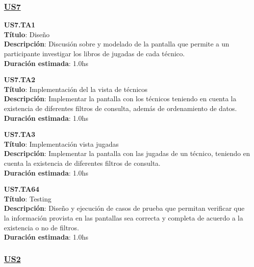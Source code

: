 \subsubsection*{\underline{US7}}

\begin{tcolorbox}
\textbf{US7.TA1} \\
\textbf{Título}: Diseño \\
\textbf{Descripción}: Discusión sobre y modelado de la pantalla que permite a un participante investigar los libros de jugadas de cada técnico.\\
\textbf{Duración estimada}: 1.0hs
\end{tcolorbox}
\vspace{10pt}

\begin{tcolorbox}
\textbf{US7.TA2} \\
\textbf{Título}: Implementación del la vista de técnicos \\
\textbf{Descripción}: Implementar la pantalla con los técnicos teniendo en cuenta la existencia de diferentes filtros de consulta, además de ordenamiento de datos.\\
\textbf{Duración estimada}: 1.0hs
\end{tcolorbox}
\vspace{10pt}

\begin{tcolorbox}
\textbf{US7.TA3} \\
\textbf{Título}: Implementación vista jugadas \\
\textbf{Descripción}: Implementar la pantalla con las jugadas de un técnico, teniendo en cuenta la existencia de diferentes filtros de consulta.\\
\textbf{Duración estimada}: 1.0hs
\end{tcolorbox}
\vspace{10pt}

\begin{tcolorbox}
\textbf{US7.TA64} \\
\textbf{Título}: Testing \\
\textbf{Descripción}: Diseño y ejecución de casos de prueba que permitan verificar que la información provista en las pantallas sea correcta y completa de acuerdo a la existencia o no de filtros.\\
\textbf{Duración estimada}: 1.0hs
\end{tcolorbox}
\vspace{10pt}

\subsubsection*{\underline{US2}}

